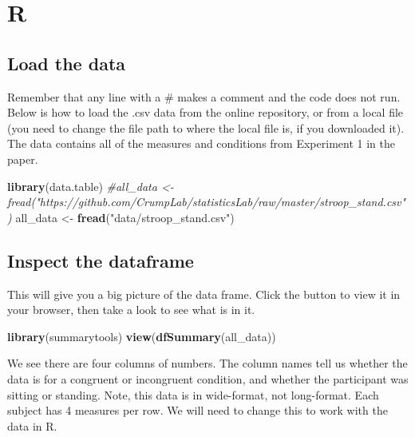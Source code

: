 \documentclass[
]{book}
\newenvironment{Shaded}{\begin{snugshade}}{\end{snugshade}}
\newcommand{\CommentTok}[1]{\textcolor[rgb]{0.56,0.35,0.01}{\textit{#1}}}
\newcommand{\FunctionTok}[1]{\textcolor[rgb]{0.13,0.29,0.53}{\textbf{#1}}}
\newcommand{\NormalTok}[1]{#1}
\newcommand{\OtherTok}[1]{\textcolor[rgb]{0.56,0.35,0.01}{#1}}
\newcommand{\StringTok}[1]{\textcolor[rgb]{0.31,0.60,0.02}{#1}}
\begin{document}
\hypertarget{r-9}{%
\section{R}\label{r-9}}

\hypertarget{load-the-data-4}{%
\subsection{Load the data}\label{load-the-data-4}}

Remember that any line with a \# makes a comment and the code does not run. Below is how to load the .csv data from the online repository, or from a local file (you need to change the file path to where the local file is, if you downloaded it). The data contains all of the measures and conditions from Experiment 1 in the paper.

\begin{Shaded}
\begin{Highlighting}[]
\FunctionTok{library}\NormalTok{(data.table)}
\CommentTok{\#all\_data \textless{}{-} fread("https://github.com/CrumpLab/statisticsLab/raw/master/stroop\_stand.csv")}
\NormalTok{all\_data }\OtherTok{\textless{}{-}} \FunctionTok{fread}\NormalTok{(}\StringTok{"data/stroop\_stand.csv"}\NormalTok{)}
\end{Highlighting}
\end{Shaded}

\hypertarget{inspect-the-dataframe-2}{%
\subsection{Inspect the dataframe}\label{inspect-the-dataframe-2}}

This will give you a big picture of the data frame. Click the button to view it in your browser, then take a look to see what is in it.

\begin{Shaded}
\begin{Highlighting}[]
\FunctionTok{library}\NormalTok{(summarytools)}
\FunctionTok{view}\NormalTok{(}\FunctionTok{dfSummary}\NormalTok{(all\_data))}
\end{Highlighting}
\end{Shaded}

We see there are four columns of numbers. The column names tell us whether the data is for a congruent or incongruent condition, and whether the participant was sitting or standing. Note, this data is in wide-format, not long-format. Each subject has 4 measures per row. We will need to change this to work with the data in R.
\end{document}
